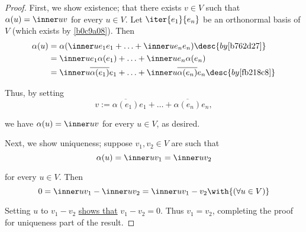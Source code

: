 \begin{proof}
  First, we show existence; that there exists $v\in V$ such that
  $\alpha(u)=\inner uv$ for every $u\in V$. Let $\iter{e_1}{e_n}$ be an
  orthonormal basis of $V$ (which exists by \autoref{b0c9a08}). Then
  \begin{align*}
    \alpha(u) &=\alpha(\inner u{e_1}e_1+\ldots+\inner u{e_n}e_n)\desc{by \autoref{b762d27}}                               \\
              &=\inner u{e_1}\alpha(e_1)+\ldots+\inner u{e_n}\alpha(e_n)                                                  \\
              &=\inner u{\overline{\alpha(e_1)}e_1}+\ldots+\inner u{\overline{\alpha(e_n)}e_n}\desc{by \autoref{fb218c8}}
  \end{align*}

  Thus, by setting
  $$
    v:=\overline{\alpha(e_1)}e_1+\ldots+\overline{\alpha(e_n)}e_n,
  $$

  we have $\alpha(u)=\inner uv$ for every $u\in V$, as desired.

  Next, we show uniqueness; suppose $v_1,v_2\in V$ are such that
  $$
    \alpha(u)=\inner u{v_1}=\inner u{v_2}
  $$

  for every $u\in V$. Then
  $$
    0=\inner u{v_1}-\inner u{v_2}=\inner u{v_1-v_2}\with{(\forall u\in V)}
  $$

  Setting $u$ to $v_1-v_2$ \href{fb218c8}{shows that} $v_1-v_2=0$. Thus
  $v_1=v_2$, completing the proof for uniqueness part of the result.
\end{proof}
